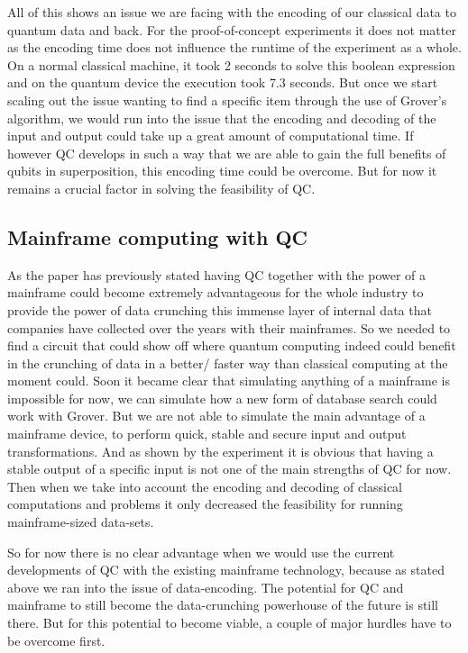 All of this shows an issue we are facing with the encoding of our classical data to quantum data and back. For the proof-of-concept experiments it does not matter as the encoding time does not influence the runtime of the experiment as a whole. On a normal classical machine, it took 2 seconds to solve this boolean expression and on the quantum device the execution took 7.3 seconds. But once we start scaling out the issue wanting to find a specific item through the use of Grover's algorithm, we would run into the issue that the encoding and decoding of the input and output could take up a great amount of computational time. If however QC develops in such a way that we are able to gain the full benefits of qubits in superposition, this encoding time could be overcome. But for now it remains a crucial factor in solving the feasibility of QC.



\subsection{Mainframe computing with QC}

As the paper has previously stated having QC together with the power of a mainframe could become extremely advantageous for the whole industry to provide the power of data crunching this immense layer of internal data that companies have collected over the years with their mainframes. So we needed to find a circuit that could show off where quantum computing indeed could benefit in the crunching of data in a better/ faster way than classical computing at the moment could. Soon it became clear that simulating anything of a mainframe is impossible for now, we can simulate how a new form of database search could work with Grover. But we are not able to simulate the main advantage of a mainframe device, to perform quick, stable and secure input and output transformations. And as shown by the experiment it is obvious that having a stable output of a specific input is not one of the main strengths of QC for now. Then when we take into account the encoding and decoding of classical computations and problems it only decreased the feasibility for running mainframe-sized data-sets.


So for now there is no clear advantage when we would use the current developments of QC with the existing mainframe technology, because as stated above we ran into the issue of data-encoding. The potential for QC and mainframe to still become the data-crunching powerhouse of the future is still there. But for this potential to become viable, a couple of major hurdles have to be overcome first.


